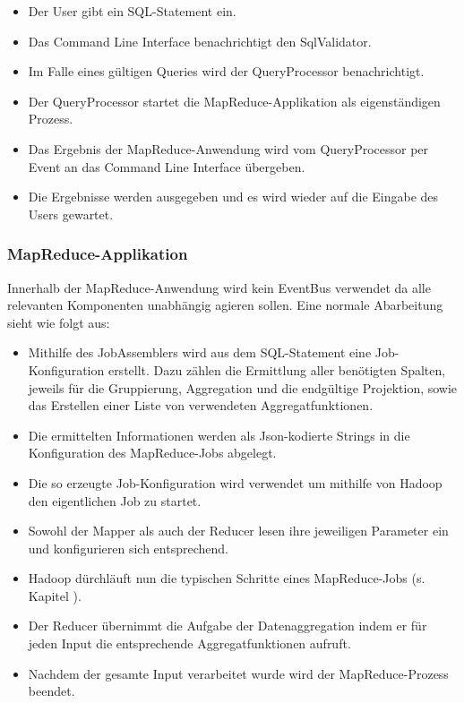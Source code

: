 \documentclass[a4paper]{article}
\begin{document}
\begin{itemize}
	\item Der User gibt ein SQL-Statement ein.
	\item Das Command Line Interface benachrichtigt den SqlValidator.
	\item Im Falle eines gültigen Queries wird der QueryProcessor benachrichtigt.
	\item Der QueryProcessor startet die MapReduce-Applikation als eigenständigen Prozess.
	\item Das Ergebnis der MapReduce-Anwendung wird vom QueryProcessor per Event an das Command Line Interface übergeben.
	\item Die Ergebnisse werden ausgegeben und es wird wieder auf die Eingabe des Users gewartet.
\end{itemize}

\subsubsection{MapReduce-Applikation}
Innerhalb der MapReduce-Anwendung wird kein EventBus verwendet da alle relevanten Komponenten unabhängig agieren sollen. Eine normale Abarbeitung sieht wie folgt aus:

\begin{itemize}
	\item Mithilfe des JobAssemblers wird aus dem SQL-Statement eine Job-Konfiguration erstellt. Dazu zählen die Ermittlung aller benötigten Spalten, jeweils für die Gruppierung, Aggregation und die endgültige Projektion, sowie das Erstellen einer Liste von verwendeten Aggregatfunktionen.
	\item Die ermittelten Informationen werden als Json-kodierte Strings in die Konfiguration des MapReduce-Jobs abgelegt.
	\item Die so erzeugte Job-Konfiguration wird verwendet um mithilfe von Hadoop den eigentlichen Job zu startet.
	\item Sowohl der Mapper als auch der Reducer lesen ihre jeweiligen Parameter ein und konfigurieren sich entsprechend.
	\item Hadoop dürchläuft nun die typischen Schritte eines MapReduce-Jobs (s. Kapitel ).
	\item Der Reducer übernimmt die Aufgabe der Datenaggregation indem er für jeden Input die entsprechende Aggregatfunktionen aufruft.
	\item Nachdem der gesamte Input verarbeitet wurde wird der MapReduce-Prozess beendet.
\end{itemize}
\end{document}

